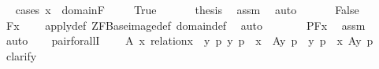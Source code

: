 \begin{isabellebody}
\ \isamarkupfalse%
\ {\isacharparenleft}{\kern0pt}cases\ {\isachardoublequoteopen}x\ {\isasymin}\ domain{\isacharparenleft}{\kern0pt}F{\isacharparenright}{\kern0pt}{\isachardoublequoteclose}{\isacharparenright}{\kern0pt}\isanewline
\ \ \ \isamarkupfalse%
\ True\isanewline
\ \ \ \isamarkupfalse%
\ \isamarkupfalse%
\ {\isacharquery}{\kern0pt}thesis\ \isamarkupfalse%
\ assm\ \isamarkupfalse%
\ auto\isanewline
\ \isamarkupfalse%
\isanewline
\ \ \ \isamarkupfalse%
\ False\isanewline
\ \ \ \isamarkupfalse%
\ \isamarkupfalse%
\ {\isachardoublequoteopen}F{\isacharbackquote}{\kern0pt}x\ {\isacharequal}{\kern0pt}\ {}{\isachardoublequoteclose}\ \isamarkupfalse%
\ apply{\isacharunderscore}{\kern0pt}def\ ZF{\isacharunderscore}{\kern0pt}Base{\isachardot}{\kern0pt}image{\isacharunderscore}{\kern0pt}def\ domain{\isacharunderscore}{\kern0pt}def\ \isamarkupfalse%
\ auto\ \isanewline
\ \ \ \isamarkupfalse%
\ \isamarkupfalse%
\ {\isachardoublequoteopen}P{\isacharparenleft}{\kern0pt}F{\isacharbackquote}{\kern0pt}x{\isacharparenright}{\kern0pt}{\isachardoublequoteclose}\ \isamarkupfalse%
\ assm\ \isamarkupfalse%
\ auto\ \isanewline
\ \isamarkupfalse%
\isanewline
{}\isamarkupfalse%
%
\endisatagproof
{\isafoldproof}%
%
\isadelimproof
\isanewline
%
\endisadelimproof
\isanewline
{}\isamarkupfalse%
\ pair{\isacharunderscore}{\kern0pt}forallI\ {\isacharcolon}{\kern0pt}\ \isanewline
\ \ {\isachardoublequoteopen}{\isasymAnd}A\ x{\isachardot}{\kern0pt}\ relation{\isacharparenleft}{\kern0pt}x{\isacharparenright}{\kern0pt}\ {\isasymLongrightarrow}\ {\isacharparenleft}{\kern0pt}{\isasymAnd}y\ p{\isachardot}{\kern0pt}\ {\isacharless}{\kern0pt}y{\isacharcomma}{\kern0pt}\ p{\isachargreater}{\kern0pt}\ {\isasymin}\ x\ {\isasymLongrightarrow}\ A{\isacharparenleft}{\kern0pt}y{\isacharcomma}{\kern0pt}\ p{\isacharparenright}{\kern0pt}{\isacharparenright}{\kern0pt}\ {\isasymLongrightarrow}\ {\isasymforall}{\isacharless}{\kern0pt}y{\isacharcomma}{\kern0pt}\ p{\isachargreater}{\kern0pt}\ {\isasymin}\ x{\isachardot}{\kern0pt}\ A{\isacharparenleft}{\kern0pt}y{\isacharcomma}{\kern0pt}\ p{\isacharparenright}{\kern0pt}{\isachardoublequoteclose}\isanewline
%
\isadelimproof
%
\endisadelimproof
%
\isatagproof
{}\isamarkupfalse%
\ {\isacharparenleft}{\kern0pt}clarify{\isacharparenright}{\kern0pt}\ \isanewline

\end{isabellebody}
